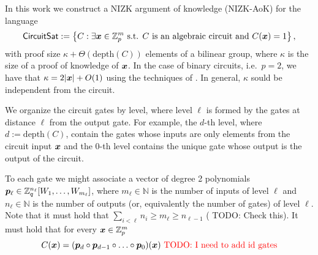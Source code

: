 
\newcommand{\setsize}{t}

In this work we construct a NIZK argument of knowledge (NIZK-AoK) for the language
\[
\mathsf{CircuitSat}:=\left\{
	C : \exists {\boldsymbol{x}}\in\mathbb{Z}_p^m \text{ s.t. } C \text{ is an algebraic circuit and } C({\boldsymbol{x}})=1
	\right\},
\]
with proof size $\kappa+\Theta(\mathrm{depth}(C))$ elements of a bilinear group, where $\kappa$ is the size of a proof of knowledge of ${\boldsymbol{x}}$. In the case of binary circuits, i.e.~$p=2$, we have that $\kappa=2|{\boldsymbol{x}}|+O(1)$ using the techniques of \cite{AC:GonHevRaf15}. In general, $\kappa$ sould be independent from the circuit.
%


We organize the circuit gates by level, where level $\ell$ is formed by the gates at distance $\ell$ from the output gate. For example, the $d$-th level, where $d:=\mathrm{depth}({C})$, contain the gates whose inputs are only elements from the circuit input ${\boldsymbol{x}}$ and the $0$-th level contains the unique gate whose output is the output of the circuit.

To each gate we might associate a vector of degree 2 polynomials ${\boldsymbol{p}}_\ell \in \mathbb{Z}_q^{n_\ell}[W_1,\ldots,W_{m_\ell}]$, where $m_\ell\in\mathbb{N}$ is the number of inputs of level $\ell$ and $n_\ell\in\mathbb{N}$ is the number of outputs (or, equivalently the number of gates) of level $\ell$. Note that it must hold that $\sum_{i<\ell} n_i\geq m_\ell \geq n_{\ell-1}$ ({\color{red} TODO: Check this}). It must hold that for every ${\boldsymbol{x}}\in\mathbb{Z}_p^m$
$$
C({\boldsymbol{x}}) = ({\boldsymbol{p}}_{d}\circ{\boldsymbol{p}}_{d-1}\circ\ldots\circ {\boldsymbol{p}}_0) ({\boldsymbol{x}}) \text{  \color{red} TODO: I need to add id gates}
$$

